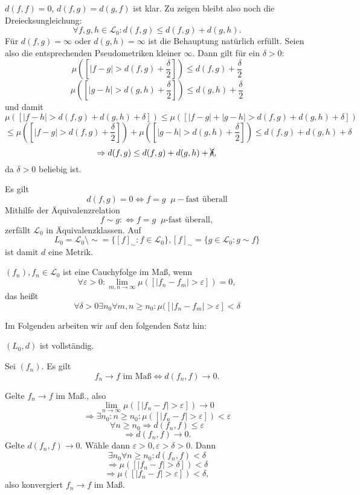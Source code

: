 			\begin{bew}
				$d(f,f)=0$, $d(f,g)=d(g,f)$ ist klar. Zu zeigen bleibt also noch die Dreiecksungleichung:
				\[ \forall f,g,h\in\mathcal{L}_0: d(f,g)\le d(f,g)+d(g,h). \]
				Für $d(f,g)=\infty$ oder $d(g,h)=\infty$ ist die Behauptung natürlich erfüllt. Seien also die entsprechenden Pseudometriken kleiner $\infty$. Dann gilt für ein $\delta >0$:
				\[ \mu([|f-g|>d(f,g)+\frac{\delta}{2}])\le d(f,g)+\frac{\delta}{2} \]
				\[ \mu([|g-h|>d(g,h)+\frac{\delta}{2}])\le d(g,h)+\frac{\delta}{2} \]
				und damit
				\[ \mu([|f-h|>d(f,g)+d(g,h)+\delta])
				\le\mu([|f-g|+|g-h|>d(f,g)+d(g,h)+\delta]) \]
				\[ \le\mu([|f-g|>d(f,g)+\frac{\delta}{2}])+\mu([|g-h|>d(g,h)+\frac{\delta}{2}])\le d(f,g)+d(g,h)+\delta \]
				\[ \Rightarrow d(f,g)\le d(f,g)+d(g,h)+\xcancel{{\delta}}, \]
				da $\delta>0$ beliebig ist.
			\end{bew}
			\begin{bem}
				Es gilt
				\[ d(f,g)=0\Leftrightarrow f=g \;\;\mu-\text{fast überall} \]
				Mithilfe der Äquivalenzrelation
				\[ f\sim g:\Leftrightarrow f=g\;\;\mu\text{-fast überall}, \]
				zerfällt $\mathcal{L}_0$ in Äquivalenzklassen. Auf \[L_0=\mathcal{L}_0\setminus\sim=\{[f]_\sim: f\in\mathcal{L}_0\}, [f]_\sim=\{g\in\mathcal{L}_0: g\sim f\}\]
				ist damit $d$ eine Metrik.
			\end{bem}
			
			\begin{defi}
				$(f_n), f_n\in\mathcal{L}_0$ ist eine Cauchyfolge im Maß, wenn 
				\[ \forall\varepsilon>0: \lim_{m,n\to\infty}\mu([|f_n-f_m|>\varepsilon])=0, \]
				das heißt
				\[ \forall \delta>0\exists n_0\forall m,n\ge n_0: \mu([|f_n-f_m|>\varepsilon]<\delta \]
			\end{defi}
			
			Im Folgenden arbeiten wir auf den folgenden Satz hin:
			\begin{satz}
				$(L_0,d)$ ist vollständig. 
			\end{satz}
			
			\begin{satz}
				Sei $(f_n)$. Es gilt
				\[ f_n\to f\text{ im Maß}\Leftrightarrow d(f_n,f)\to 0. \]
			\end{satz}
			
			\begin{bew}
				Gelte $f_n\to f$ im Maß., also
				\[ \lim_{n\to\infty} \mu([|f_n-f|>\varepsilon])\to 0 \]
				\[ \Rightarrow \exists n_0: n\ge n_0: \mu([|f_n-f|>\varepsilon])<\varepsilon \]
				\[ \forall n\ge n_0\Rightarrow d(f_n,f)\le \varepsilon \]
				\[ \Rightarrow d(f_n,f)\to 0. \]
				Gelte $d(f_n,f)\to 0$. Wähle dann $\varepsilon>0, \varepsilon>\delta>0$.  Dann 
				\[ \exists n_0\forall n\ge n_0: d(f_n,f)<\delta  \]
				\[ \Rightarrow \mu([|f_n-f|>\delta])<\delta \]
				\[ \Rightarrow \mu([|f_n-f|>\varepsilon])<\delta, \]
				also konvergiert $f_n\to f$ im Maß. 
			\end{bew}
			
